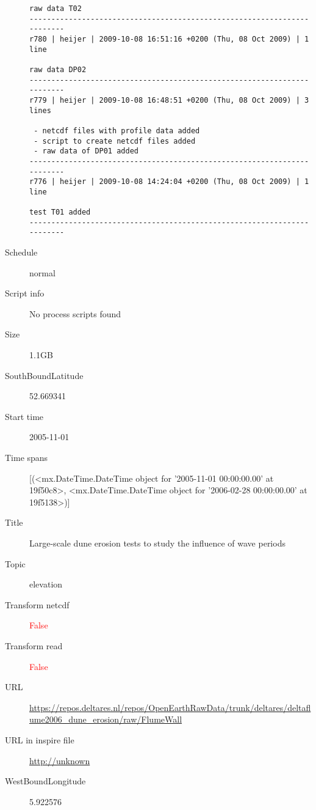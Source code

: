 \documentclass[9]{report}
\begin{document}
\begin{description}
\begin{verbatim}
raw data T02
------------------------------------------------------------------------
r780 | heijer | 2009-10-08 16:51:16 +0200 (Thu, 08 Oct 2009) | 1 line

raw data DP02
------------------------------------------------------------------------
r779 | heijer | 2009-10-08 16:48:51 +0200 (Thu, 08 Oct 2009) | 3 lines

 - netcdf files with profile data added
 - script to create netcdf files added
 - raw data of DP01 added
------------------------------------------------------------------------
r776 | heijer | 2009-10-08 14:24:04 +0200 (Thu, 08 Oct 2009) | 1 line

test T01 added
------------------------------------------------------------------------

\end{verbatim}
  \item[Schedule] normal
  \item[Script info] No process scripts found
  \item[Size] 1.1GB
  \item[SouthBoundLatitude] 52.669341
  \item[Start time] 2005-11-01
  \item[Time spans] [(<mx.DateTime.DateTime object for '2005-11-01 00:00:00.00' at 19f50c8>, <mx.DateTime.DateTime object for '2006-02-28 00:00:00.00' at 19f5138>)]
  \item[Title]  Large-scale dune erosion tests to study the influence of wave periods 
  \item[Topic] elevation
  \item[Transform netcdf] \textcolor{red}{False}
  \item[Transform read] \textcolor{red}{False}
  \item[URL] \href{https://repos.deltares.nl/repos/OpenEarthRawData/trunk/deltares/deltaflume2006\_dune\_erosion/raw/FlumeWall}{https://repos.deltares.nl/repos/OpenEarthRawData/trunk/deltares/deltaflume2006\_dune\_erosion/raw/FlumeWall}
  \item[URL in inspire file] \href{http://unknown}{http://unknown}
  \item[WestBoundLongitude] 5.922576
\end{description}
\end{document}
